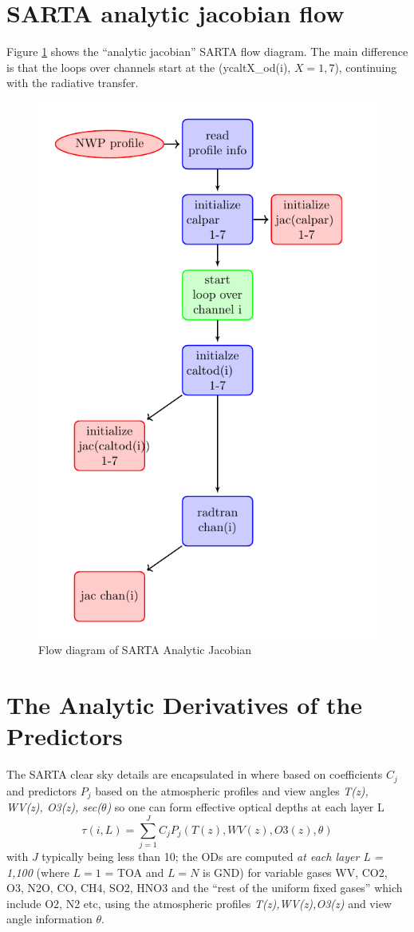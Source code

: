 \documentclass[11pt]{article}
\newcommand{\sa}{\textsf{SARTA}\xspace}
\begin{document}
\section{\sa analytic jacobian flow}

Figure \ref{fig:fig2} shows the ``analytic jacobian'' \sa flow diagram. The main difference is that
the loops over channels start at the (ycaltX\_od(i), $X=1,7$), continuing 
with the radiative transfer.

\begin{figure}[ht] \centering
   \includegraphics[width=.75\textwidth]{sarta_diagram2.pdf}
\caption{Flow diagram of \sa Analytic Jacobian}
\label{fig:fig2}
\end{figure}

\section{The Analytic Derivatives of the Predictors}

The SARTA clear sky details are encapsulated in \eg \citep{str:02*2}
where based on coefficients $C_j$ and predictors $P_j$ based on the
atmospheric profiles and view angles \textit{T(z), WV(z), O3(z), sec($\theta$)}
so one can form effective optical depths at each layer L
\[
\tau(i,L) = \sum_{j=1}^J C_{j} P_{j}(T(z),WV(z),O3(z),\theta)
\]
with $J$ typically being less than 10; the ODs are computed \textit{at each layer L = 1,100}
(where $L=1$ = TOA and $L=N$ is GND) for \eg variable gases WV, CO2,
O3, N2O, CO, CH4, SO2, HNO3 and the ``rest of the uniform fixed
gases'' which include O2, N2 etc, using the atmospheric profiles \textit{T(z),WV(z),O3(z)} and
view angle information $\theta$.
\end{document}
